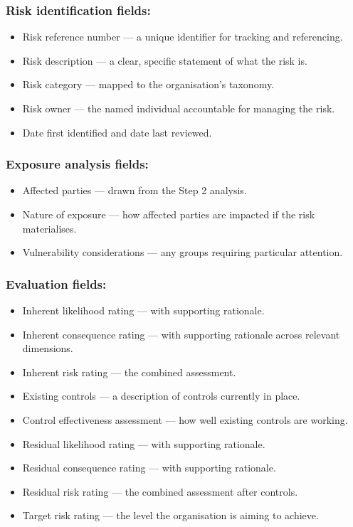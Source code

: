 \subsubsection{Risk identification fields:}
\begin{itemize}
    \item{Risk reference number — a unique identifier for tracking and referencing.}
    \item{Risk description — a clear, specific statement of what the risk is.}
    \item{Risk category — mapped to the organisation's taxonomy.}
    \item{Risk owner — the named individual accountable for managing the risk.}
    \item{Date first identified and date last reviewed.}
\end{itemize}

\subsubsection{Exposure analysis fields:}
\begin{itemize}
    \item{Affected parties — drawn from the Step 2 analysis.}
    \item{Nature of exposure — how affected parties are impacted if the risk materialises.}
    \item{Vulnerability considerations — any groups requiring particular attention.}
\end{itemize}
\subsubsection{Evaluation fields:}
\begin{itemize}
    \item{Inherent likelihood rating — with supporting rationale.}
    \item{Inherent consequence rating — with supporting rationale across relevant dimensions.}
    \item{Inherent risk rating — the combined assessment.}
    \item{Existing controls — a description of controls currently in place.}
    \item{Control effectiveness assessment — how well existing controls are working.}
    \item{Residual likelihood rating — with supporting rationale.}
    \item{Residual consequence rating — with supporting rationale.}
    \item{Residual risk rating — the combined assessment after controls.}
    \item{Target risk rating — the level the organisation is aiming to achieve.}
\end{itemize}
